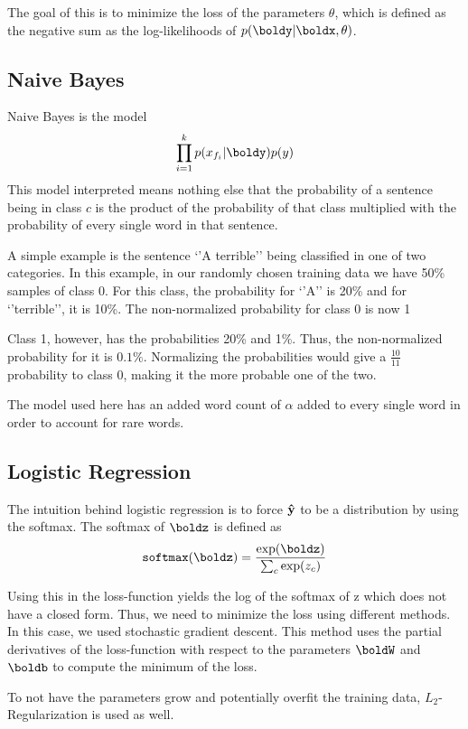 \documentclass[11pt]{article}
\begin{document}
The goal of this is to minimize the loss of the parameters $\theta$, which is defined as the negative sum as the log-likelihoods of $p(\boldy|\boldx,\theta)$.


\subsection{Naive Bayes}

Naive Bayes is the model $$\prod_{i=1}^kp(x_{f_i}|\boldy)p(y)$$
This model interpreted means nothing else that the probability of a sentence being in class $c$ is the product of the probability of that class multiplied with the probability of every single word in that sentence. 

A simple example is the sentence `'A terrible'' being classified in one of two categories. In this example, in our randomly chosen training data we have 50\% samples of class $0$. For this class, the probability for `'A'' is 20\% and for `'terrible'', it is 10\%. The non-normalized probability for class 0 is now 1%

Class 1, however, has the probabilities 20\% and 1\%. Thus, the non-normalized probability for it is $0.1\%$. Normalizing the probabilities would give a $\frac{10}{11}$ probability to class 0, making it the more probable one of the two. 

The model used here has an added word count of $\alpha$ added to every single word in order to account for rare words. 

\subsection{Logistic Regression}

The intuition behind logistic regression is to force $\bold{\hat{y}}$ to be a distribution by using the softmax. The softmax of $\boldz$ is defined as $$\texttt{softmax}(\boldz)=\frac{\exp(\boldz)}{\sum_c\exp(z_c)}$$

Using this in the loss-function yields the log of the softmax of z which does not have a closed form. Thus, we need to minimize the loss using different methods. In this case, we used stochastic gradient descent. 
This method uses the partial derivatives of the loss-function with respect to the parameters $\boldW$ and $\boldb$ to compute the minimum of the loss. 

To not have the parameters grow and potentially overfit the training data, $L_2$-Regularization is used as well. 
\end{document}
